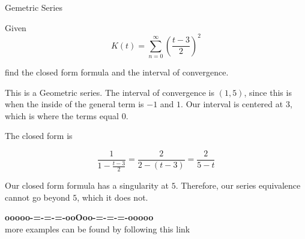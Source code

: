 \documentclass{ximera}
\begin{document}
\begin{example} Gemetric Series


Given 
\[    K(t) =   \sum_{n=0}^{\infty}  \left( \frac{t-3}{2} \right)^2\]

find the closed form formula and the interval of convergence.




\begin{explanation}


This is a Geometric series.  The interval of convergence is $(1, 5)$, since this is when the inside of the general term is $-1$ and $1$. Our interval is centered at $3$, which is where the terms equal $0$.


The closed form is

\[  \frac{1}{1 - \frac{t-3}{2}}  =     \frac{2}{2-(t-3)} =    \frac{2}{5-t}        \]



\end{explanation}


Our closed form formula has a singularity at $5$.  Therefore, our series equivalence cannot go beyond $5$, which it does not.




\begin{center}
\end{center}




\end{example}











\begin{center}
\textbf{\textcolor{green!50!black}{ooooo-=-=-=-ooOoo-=-=-=-ooooo}} \\

more examples can be found by following this link\\ 

\end{center}
\end{document}
